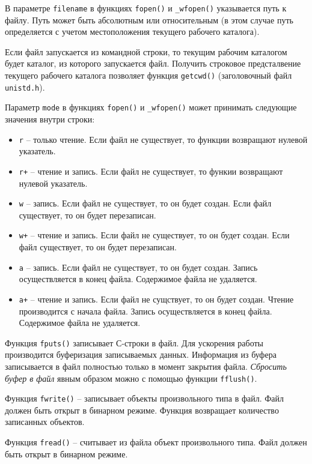 \documentclass[%
	11pt,
	a4paper,
	utf8,
		]{article}
\begin{document}
В параметре \verb|filename| в функциях \verb|fopen()| и \verb|_wfopen()| указывается путь к файлу. Путь может быть абсолютным или относительным (в этом случае путь определяется с учетом местоположения текущего рабочего каталога). 

Если файл запускается из командной строки, то текущим рабочим каталогом будет каталог, из которого запускается файл. Получить строковое предсталвение текущего рабочего каталога позволяет функция \verb|getcwd()| (заголовочный файл \verb|unistd.h|).

Параметр \verb|mode| в функциях \verb|fopen()| и \verb|_wfopen()| может принимать следующие значения внутри строки:
\begin{itemize}
	\item \verb|r| -- только чтение. Если файл не существует, то функции возвращают нулевой указатель.
	
	\item \verb|r+| -- чтение и запись. Если файл не существует, то функии возвращают нулевой указатель.
	
	\item \verb|w| -- запись. Если файл не существует, то он будет создан. Если файл существует, то он будет перезаписан.
	
	\item \verb|w+| -- чтение и запись. Если файл не существует, то он будет создан. Если файл существует, то он будет перезаписан.
	
	\item \verb|a| -- запись. Если файл не существует, то он будет создан. Запись осуществляется в конец файла. Содержимое файла не удаляется.
	
	\item \verb|a+| -- чтение и запись. Если файл не сущствует, то он будет создан. Чтение производится с начала файла. Запись осуществляется в конец файла. Содержимое файла не удаляется.
\end{itemize}

Функция \verb|fputs()| записывает С-строки в файл. Для ускорения работы производится буферизация записываемых данных. Информация из буфера записывается в файл полностью только в момент закрытия файла. \emph{Сбросить буфер в файл} явным образом можно с помощью функции \verb|fflush()|.

Функция \verb|fwrite()| -- записывает объекты произвольного типа в файл. Файл должен быть открыт в бинарном режиме. Функция возвращает количество записанных объектов.

Функция \verb|fread()| -- считывает из файла объект произвольного типа. Файл должен быть открыт в бинарном режиме.
\end{document}
